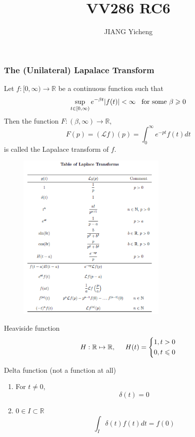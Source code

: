 \documentclass{beamer}
\title{\textcolor[rgb]{0,0.168,0.376}{VV286 RC6}}
\author{JIANG Yicheng}
\begin{document}
\begin{frame}
\titlepage
\end{frame}




\begin{frame}
\frametitle{The (Unilateral) Lapalace Transform}
Let $f:[0,\infty)\rightarrow\mathbb{R}$ be a continuous function such that
$$\sup_{t\in[0,\infty)}e^{-\beta t}|f(t)|<\infty\hspace{3mm}\text{for some }\beta\geqslant0$$
Then the function $F:(\beta,\infty)\rightarrow\mathbb{R}$,
$$F(p)=(\mathscr{L} f)(p)=\int_0^{\infty}e^{-pt}f(t)dt$$
is called the Lapalace transform of $f$.


\end{frame}


\begin{frame}
\begin{figure}[h]
    \centering
    \includegraphics[height=8.2cm]{lapalace.png}
\end{figure}
\end{frame}

\begin{frame}
\begin{block}{Heaviside function}
$$H:\mathbb{R}\mapsto\mathbb{R},\hspace{5mm}H(t)=\left\{
\begin{aligned}
&1,t>0\\
&0,t\leqslant0\\
\end{aligned}
\right.$$
\end{block}

\begin{block}{Delta function (not a function at all)}
\begin{enumerate}
\item For $t\neq0$,
$$\delta(t)=0$$
\item $0\in I\subset\mathbb{R}$
$$\int_I\delta(t)f(t)dt=f(0)$$
\end{enumerate}
\end{block}
\end{frame}
\end{document}
